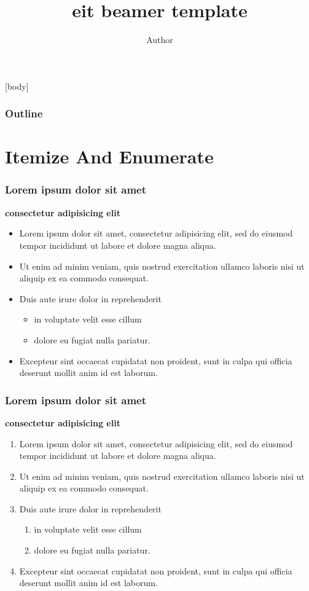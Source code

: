\documentclass[trans]{beamer}
\title[eit beamer template]{eit beamer template}
\author{Author}
\institute[Department of Electrical and Information Technology, Lund University, Sweden]{Department of Electrical and Information Technology\\Lund University}
\begin{document}
\begin{frame}
	\titlepage
\end{frame}
[body]

\begin{frame}
    \frametitle{Outline}
    \tableofcontents
\end{frame}

\section{Itemize And Enumerate}
\begin{frame}
	\frametitle{Lorem ipsum dolor sit amet}
	
	\textbf{consectetur adipisicing elit}
	\begin{itemize}
		\item Lorem ipsum dolor sit amet, consectetur adipisicing elit, sed do eiusmod tempor incididunt ut labore et dolore magna aliqua.
		\item Ut enim ad minim veniam, quis nostrud exercitation ullamco laboris nisi ut aliquip ex ea commodo consequat. 
		\item Duis aute irure dolor in reprehenderit 
		\begin{itemize}
			\item in voluptate velit esse cillum 
			\item dolore eu fugiat nulla pariatur. 
		\end{itemize}
		\item Excepteur sint occaecat cupidatat non proident, sunt in culpa qui officia deserunt mollit anim id est laborum.
	\end{itemize}
\end{frame}

\begin{frame}
	\frametitle{Lorem ipsum dolor sit amet}
	
	\textbf{consectetur adipisicing elit}
	\begin{enumerate}
		\item Lorem ipsum dolor sit amet, consectetur adipisicing elit, sed do eiusmod tempor incididunt ut labore et dolore magna aliqua.
		\item Ut enim ad minim veniam, quis nostrud exercitation ullamco laboris nisi ut aliquip ex ea commodo consequat. 
		\item Duis aute irure dolor in reprehenderit 
		\begin{enumerate}
			\item in voluptate velit esse cillum 
			\item dolore eu fugiat nulla pariatur. 
		\end{enumerate}
		\item Excepteur sint occaecat cupidatat non proident, sunt in culpa qui officia deserunt mollit anim id est laborum.
	\end{enumerate}
\end{frame}
\end{document}
